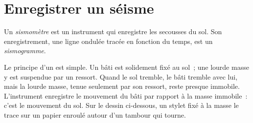 \section{Enregistrer un séisme}

\begin{definition}\label{def:g7:earthquakes:seismometer}
Un \emph{sismomètre} est un instrument qui
enregistre les secousses du sol. Son enregistrement, une ligne ondulée
tracée en fonction du temps, est un
\emph{sismogramme}.
\end{definition}

Le principe d'un  est simple. Un bâti est solidement fixé au
sol~; une lourde masse y est suspendue par un ressort. Quand le sol
tremble, le bâti tremble avec lui, mais la lourde masse, tenue seulement
par son ressort, reste presque immobile. L'instrument enregistre le
mouvement du bâti par rapport à la masse immobile~: c'est le mouvement du
sol. Sur le dessin ci-dessous, un stylet fixé à la masse le trace sur un
papier enroulé autour d'un tambour qui tourne.

